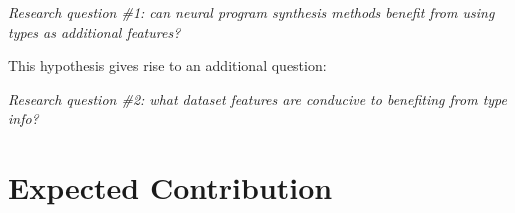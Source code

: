 \documentclass{article}
\begin{document}
\begin{displayquote} %
    \emph{Research question \#1: can neural program synthesis methods benefit from using types as additional features?}
\end{displayquote}

This hypothesis gives rise to an additional question:
\begin{displayquote} %
    \emph{Research question \#2: what dataset features are conducive to benefiting from type info?}
\end{displayquote}





\section{Expected Contribution} %
\end{document}
